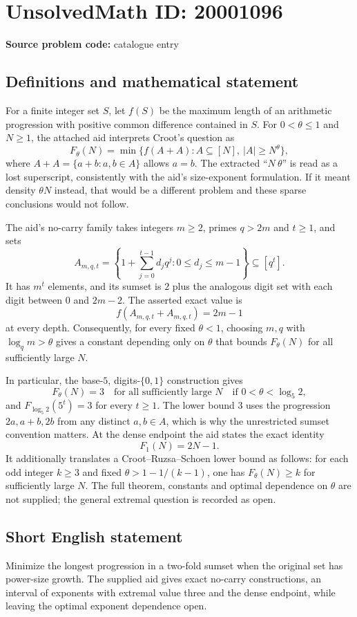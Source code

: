 \documentclass[11pt]{article}
\begin{document}
\section*{UnsolvedMath ID: 20001096}
\textbf{Source problem code:} catalogue entry
\subsection{Definitions and mathematical statement}
For a finite integer set $S$, let $f(S)$ be the maximum length of an arithmetic progression with positive common difference contained in $S$. For $0<\theta\le1$ and $N\ge1$, the attached aid interprets Croot's question as
\[
F_\theta(N)=\min\{f(A+A):A\subseteq[N],\ |A|\ge N^\theta\},
\]
where $A+A=\{a+b:a,b\in A\}$ allows $a=b$. The extracted ``$N\ \theta$'' is read as a lost superscript, consistently with the aid's size-exponent formulation. If it meant density $\theta N$ instead, that would be a different problem and these sparse conclusions would not follow.

The aid's no-carry family takes integers $m\ge2$, primes $q>2m$ and $t\ge1$, and sets
\[
A_{m,q,t}=\left\{1+\sum_{j=0}^{t-1}d_jq^j:0\le d_j\le m-1\right\}\subseteq[q^t].
\]
It has $m^t$ elements, and its sumset is $2$ plus the analogous digit set with each digit between $0$ and $2m-2$. The asserted exact value is
\[
f(A_{m,q,t}+A_{m,q,t})=2m-1
\]
at every depth. Consequently, for every fixed $\theta<1$, choosing $m,q$ with $\log_qm>\theta$ gives a constant depending only on $\theta$ that bounds $F_\theta(N)$ for all sufficiently large $N$.

In particular, the base-$5$, digits-$\{0,1\}$ construction gives
\[
F_\theta(N)=3\quad\text{for all sufficiently large }N
\quad\text{if }0<\theta<\log_5 2,
\]
and $F_{\log_5 2}(5^t)=3$ for every $t\ge1$. The lower bound $3$ uses the progression $2a,a+b,2b$ from any distinct $a,b\in A$, which is why the unrestricted sumset convention matters. At the dense endpoint the aid states the exact identity
\[
F_1(N)=2N-1.
\]
It additionally translates a Croot--Ruzsa--Schoen lower bound as follows: for each odd integer $k\ge3$ and fixed $\theta>1-1/(k-1)$, one has $F_\theta(N)\ge k$ for sufficiently large $N$. The full theorem, constants and optimal dependence on $\theta$ are not supplied; the general extremal question is recorded as open.
\subsection{Short English statement}
Minimize the longest progression in a two-fold sumset when the original set has power-size growth. The supplied aid gives exact no-carry constructions, an interval of exponents with extremal value three and the dense endpoint, while leaving the optimal exponent dependence open.
\end{document}
